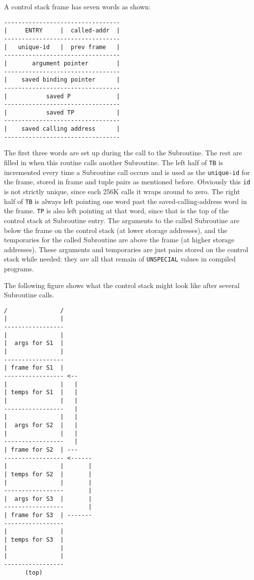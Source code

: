 \documentclass[a4paper]{scrbook}
\begin{document}
A control stack frame has seven words as shown:

\begin{verbatim}
---------------------------------
|     ENTRY     |  called-addr  |
---------------------------------
|   unique-id   |  prev frame   |
---------------------------------
|       argument pointer        |
---------------------------------
|    saved binding pointer      |
---------------------------------
|           saved P             |
---------------------------------
|           saved TP            |
---------------------------------
|    saved calling address      |
---------------------------------
\end{verbatim}

The first three words are set up during the call to the Subroutine. The rest are filled in when this routine calls another
Subroutine. The left half of \texttt{TB} is incremented every time a Subroutine call occurs and is used as the
\texttt{unique-id} for the frame, stored in frame and tuple pairs as mentioned before. Obviously this \texttt{id} is not
strictly unique, since each 256K calls it wraps around to zero. The right half of \texttt{TB} is always left pointing one
word past the saved-calling-address word in the frame. \texttt{TP} is also left pointing at that word, since that is the
top of the control stack at Subroutine entry. The arguments to the called Subroutine are below the frame on the control
stack (at lower storage addresses), and the temporaries for the called Subroutine are above the frame (at higher storage
addresses). These arguments and temporaries are just pairs stored on the control stack while needed: they are all that
remain of \texttt{UNSPECIAL} values in compiled programs.

The following figure shows what the control stack might look like after several Subroutine calls.

\begin{verbatim}
/               /
|               |
-----------------
|               |
|  args for S1  |
|               |
-----------------
| frame for S1  |
----------------- <--
|               |   |
| temps for S1  |   |
|               |   |
-----------------   |
|               |   |
|  args for S2  |   |
|               |   |
-----------------   |
| frame for S2  | ---
----------------- <------
|               |       |
| temps for S2  |       |
|               |       |
-----------------       |
|  args for S3  |       |
-----------------       |
| frame for S3  | -------
-----------------
|               |
| temps for S3  |
|               |
|               |
-----------------
      (top)
\end{verbatim}
\end{document}
